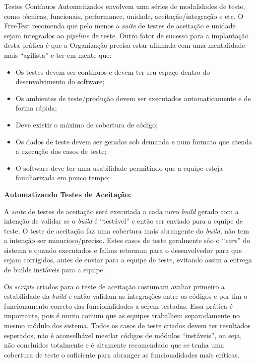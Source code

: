 Testes Contínuos Automatizados envolvem uma séries de modalidades de teste, como técnicas, funcionais, performance, unidade, aceitação/integração e etc. O FreeTest recomenda que pelo menos a \textit{suite} de testes de aceitação e unidade sejam integrados ao \textit{pipeline} de teste. Outro fator de sucesso para a implantação desta prática é que a Organização precisa estar alinhada com uma mentalidade mais “agilista” e ter em mente que:

\begin{itemize}
	\item Os testes devem ser contínuos e devem ter seu espaço dentro do desenvolvimento do software;
	\item Os ambientes de teste/produção devem ser executados automaticamente e de forma rápida;
	\item Deve existir o máximo de cobertura de código;
	\item Os dados de teste devem ser gerados sob demanda e num formato que atenda a execução dos casos de teste;
	\item O software deve ter uma usabilidade permitindo que a equipe esteja familiarizada em pouco tempo;
\end{itemize}

\textbf{Automatizando Testes de Aceitação:}

A \textit{suite} de testes de aceitação será executada a cada novo \textit{build} gerado com a intenção de validar se o \textit{build} é “testável” e então ser enviado para a equipe de teste. O teste de aceitação faz uma cobertura mais abrangente do \textit{build}, não tem a intenção ser minucioso/preciso. Estes casos de teste geralmente são o “\textit{core}” do sistema e quando executados e falhos retornam para o desenvolvedor para que sejam corrigidos, antes de enviar para a equipe de teste, evitando assim a entrega de builds instáveis para a equipe.

Os \textit{scripts} criados para o teste de aceitação costumam avaliar primeiro a estabilidade da \textit{build} e então validam as integrações entre os códigos e por fim o funcionamento correto das funcionalidades a serem testadas. Essa prática é importante, pois é muito comum que as equipes trabalhem separadamente no mesmo módulo dos sistema. Todos os casos de teste criados devem ter resultados esperados, não é aconselhável mesclar códigos de módulos “instáveis”, ou seja, não concluídos totalmente e é altamente recomendado que se tenha uma cobertura de teste o suficiente para abranger as funcionalidades mais críticas.

